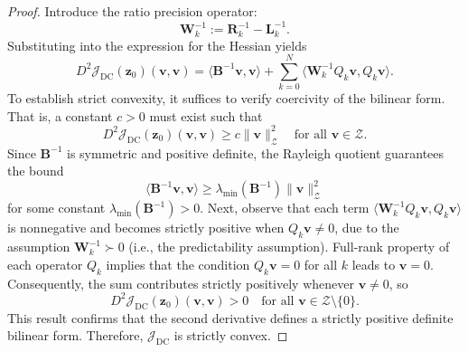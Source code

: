 \documentclass[final,1p,times]{elsarticle}
\begin{document}
\begin{proof}
Introduce the ratio precision operator:
\begin{equation}
\mathbf{W}_{k}^{-1} := \mathbf{R}_k^{-1} - \mathbf{L}_k^{-1}.
\end{equation}
Substituting into the expression for the Hessian yields
\begin{equation}
D^2 \mathcal{J}_{\mathrm{DC}}(\mathbf{z}_0)\left(\mathbf{v}, \mathbf{v}\right) =
\langle \mathbf{B}^{-1} \mathbf{v}, \mathbf{v} \rangle
+ \sum_{k=0}^N \langle \mathbf{W}_{k}^{-1} Q_k \mathbf{v}, Q_k \mathbf{v} \rangle.
\end{equation}
To establish strict convexity, it suffices to verify coercivity of the bilinear form. That is, a constant $ c > 0 $ must exist such that
\begin{equation}
D^2 \mathcal{J}_{\mathrm{DC}}(\mathbf{z}_0)\left(\mathbf{v}, \mathbf{v}\right) \geq c \| \mathbf{v} \|_{\mathcal{Z}}^2 \quad \text{for all } \mathbf{v} \in \mathcal{Z}.
\end{equation}
Since $ \mathbf{B}^{-1} $ is symmetric and positive definite, the Rayleigh quotient guarantees the bound
\begin{equation}
\langle \mathbf{B}^{-1} \mathbf{v}, \mathbf{v} \rangle \geq \lambda_{\min}\left(\mathbf{B}^{-1}\right) \| \mathbf{v} \|_{\mathcal{Z}}^2
\end{equation}
for some constant $ \lambda_{\min}\left(\mathbf{B}^{-1}\right) > 0 $. Next, observe that each term $ \langle \mathbf{W}_{k}^{-1} Q_k \mathbf{v}, Q_k \mathbf{v} \rangle $ is nonnegative and becomes strictly positive when $ Q_k \mathbf{v} \neq 0 $, due to the assumption $ \mathbf{W}_{k}^{-1} \succ 0 $ (i.e., the predictability assumption). Full-rank property of each operator $ Q_k $ implies that the condition $ Q_k \mathbf{v} = 0 $ for all $ k $ leads to $ \mathbf{v} = 0 $. Consequently, the sum contributes strictly positively whenever $ \mathbf{v} \neq 0 $, so
\begin{equation}
D^2 \mathcal{J}_{\mathrm{DC}}(\mathbf{z}_0)\left(\mathbf{v}, \mathbf{v}\right) > 0 \quad \text{for all } \mathbf{v} \in \mathcal{Z} \setminus \{0\}.
\end{equation}
This result confirms that the second derivative defines a strictly positive definite bilinear form. Therefore, $ \mathcal{J}_{\mathrm{DC}} $ is strictly convex.
\end{proof}
\end{document}
